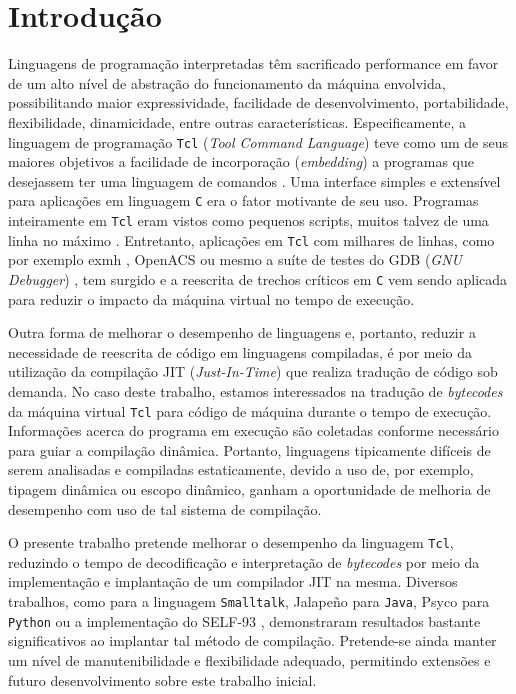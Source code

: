 \setcounter{secnumdepth}{4}

\section{Introdução}

Linguagens de programação interpretadas têm sacrificado performance
em favor de um alto nível de abstração do funcionamento da máquina
envolvida, possibilitando maior expressividade, facilidade de
desenvolvimento, portabilidade, flexibilidade, dinamicidade, entre outras
características.
Especificamente, a linguagem de programação \texttt{Tcl}
(\textit{Tool Command Language}) teve como um de seus maiores
objetivos a facilidade de incorporação (\textit{embedding}) a
programas que desejassem ter uma linguagem de comandos
\cite{ousterhout_89}. Uma interface simples e extensível para
aplicações em linguagem \texttt{C} era o fator motivante de seu uso.
Programas inteiramente em \texttt{Tcl} eram vistos como pequenos
scripts, muitos talvez de uma linha no máximo \cite{ousterhout_89}.
Entretanto, aplicações em \texttt{Tcl} com milhares de linhas,
como por exemplo exmh \cite{exmh}, OpenACS \cite{openacs} ou mesmo a
suíte de testes do GDB (\textit{GNU Debugger}) \cite{gdb_testsuite},
tem surgido e a reescrita de trechos críticos em \texttt{C} vem sendo
aplicada para reduzir o impacto da máquina virtual no tempo de execução.

Outra forma de melhorar o desempenho de linguagens e, portanto,
reduzir a necessidade de reescrita de código em linguagens compiladas,
é por meio da utilização da compilação JIT (\textit{Just-In-Time}) que
realiza tradução de código sob demanda. No caso deste trabalho, estamos
interessados na tradução de \textit{bytecodes} da máquina virtual
\texttt{Tcl} para código de máquina durante o tempo de execução.
Informações acerca do programa em execução são coletadas
conforme necessário para guiar a compilação dinâmica. Portanto,
linguagens tipicamente difíceis de serem analisadas e compiladas
estaticamente, devido a uso de, por exemplo, tipagem dinâmica ou
escopo dinâmico, ganham a oportunidade de melhoria de desempenho
com uso de tal sistema de compilação.

O presente trabalho pretende melhorar o desempenho da linguagem
\texttt{Tcl}, reduzindo o tempo de decodificação e interpretação
de \textit{bytecodes} por meio da implementação e implantação de um
compilador JIT na mesma. Diversos trabalhos, como
\cite{deutsch84efficient} para a linguagem \texttt{Smalltalk},
Jalapeño \cite{jalapeno_1} para \texttt{Java}, Psyco \cite{psyco}
para \texttt{Python} ou a implementação do SELF-93 \cite{holzle},
demonstraram resultados bastante significativos ao implantar tal
método de compilação. Pretende-se ainda manter um nível de
manutenibilidade e flexibilidade adequado, permitindo extensões e
futuro desenvolvimento sobre este trabalho inicial.

